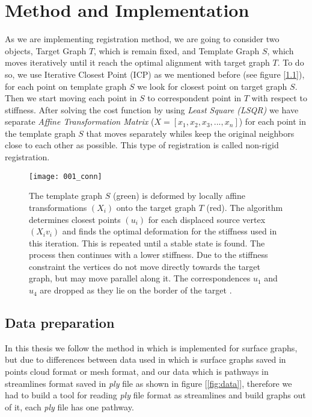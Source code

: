 \documentclass[../structure.tex]{subfiles}
\begin{document}
\chapter{Method and Implementation}
\hspace{2em}As we are implementing registration method, we are going to consider two objects, Target Graph $T$, which is remain fixed, and Template Graph $S$, which moves iteratively until it reach the optimal alignment with target graph $T$. To do so, we use Iterative Closest Point (ICP) as we mentioned before (see figure [\ref{fig:icp}]), for each point on template graph $S$ we look for closest point on target graph $S$. Then we start moving each point in $S$ to correspondent point in $T$ with respect to stiffness. After solving the cost function by using \textit{Least Square (LSQR)} we have separate \textit{Affine Transformation Matrix} ($X = [x_{1}, x_{2}, x_{3}, ...,x_{n}]$) for each point in the template graph $S$ that moves separately whiles keep the original neighbors close to each other as possible. This type of registration is called non-rigid registration.

\begin{figure}[h!]
\centering
\texttt{[image: 001\_conn]}
\captionsetup{justification=centering}
\caption{The template graph $S$ (green) is deformed by locally affine transformations $(X_{i})$ onto the target graph $T$ (red). The algorithm determines closest points $(u_{i})$ for each displaced source vertex $(X_{i}v_{i})$ and finds the optimal deformation for the stiffness used in this iteration. This is repeated until a stable state is found. The process then continues with a lower stiffness. Due to the stiffness constraint the vertices do not move directly towards the target graph, but may move parallel along it. The correspondences $u_{1}$
and $u_{4}$ are dropped as they lie on the border of the target \cite{Amberg2007}.}
\label{fig:icp}
\end{figure}

\section{Data preparation}
\hspace{2em}In this thesis we follow the method in \cite{Amberg2007} which is implemented for surface graphs, but due to differences between data used in \cite{Amberg2007} which is surface graphs saved in points cloud format or mesh format, and our data which is pathways in streamlines format saved in \textit{ply} file as shown in figure [\ref{fig:data}], therefore  we had to build a tool for reading \textit{ply} file format as streamlines and build graphs out of it, each \textit{ply} file has one pathway.
\end{document}
